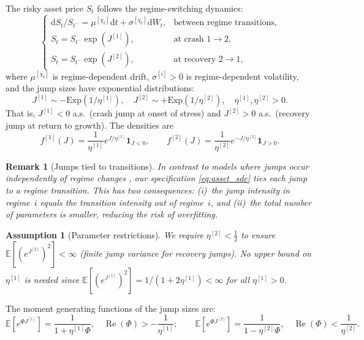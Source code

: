 \documentclass[11pt,a4paper]{article}
\numberwithin{equation}{section}
\newtheorem{remark}[theorem]{Remark}
\newtheorem{assumption}[theorem]{Assumption}
\newcommand{\E}{\mathbb{E}}
\newcommand{\dd}{\mathrm{d}}
\newcommand{\ind}{\mathbf{1}}
\DeclareMathOperator{\re}{Re}
\begin{document}
The risky asset price $S_t$ follows the regime-switching dynamics:
\begin{equation}\label{eq:asset_sde}
\begin{cases}
\dd S_t / S_{t^-} = \mu^{[\chi_t]} \dd t + \sigma^{[\chi_t]} \dd W_t, & \text{between regime transitions,} \\[4pt]
S_t = S_{t^-} \exp(J^{[1]}), & \text{at crash } 1 \to 2, \\[4pt]
S_t = S_{t^-} \exp(J^{[2]}), & \text{at recovery } 2 \to 1,
\end{cases}
\end{equation}
where $\mu^{[\chi_t]}$ is regime-dependent drift, $\sigma^{[i]} > 0$ is regime-dependent volatility, and the jump sizes have exponential distributions:
\begin{equation}\label{eq:jump_dist}
J^{[1]} \sim -\mathrm{Exp}(1/\eta^{[1]}), \quad J^{[2]} \sim +\mathrm{Exp}(1/\eta^{[2]}), \quad \eta^{[1]}, \eta^{[2]} > 0.
\end{equation}
That is, $J^{[1]} < 0$ a.s.\ (crash jump at onset of stress) and $J^{[2]} > 0$ a.s.\ (recovery jump at return to growth). The densities are
\begin{equation}\label{eq:jump_pdf}
f^{[1]}(J) = \frac{1}{\eta^{[1]}} e^{J/\eta^{[1]}} \ind_{J < 0}, \qquad f^{[2]}(J) = \frac{1}{\eta^{[2]}} e^{-J/\eta^{[2]}} \ind_{J > 0}.
\end{equation}

\begin{remark}[Jumps tied to transitions]\label{rem:jump_tied}
In contrast to models where jumps occur independently of regime changes \citep[e.g.,][]{ShiXu2025}, our specification \eqref{eq:asset_sde} ties each jump to a regime transition. This has two consequences: (i)~the jump intensity in regime~$i$ equals the transition intensity out of regime~$i$, and (ii)~the total number of parameters is smaller, reducing the risk of overfitting.
\end{remark}

\begin{assumption}[Parameter restrictions]\label{ass:params}
We require $\eta^{[2]} < \tfrac{1}{2}$ to ensure $\E[(e^{J^{[2]}})^2] < \infty$ (finite jump variance for recovery jumps). No upper bound on $\eta^{[1]}$ is needed since $\E[(e^{J^{[1]}})^2] = 1/(1+2\eta^{[1]}) < \infty$ for all $\eta^{[1]} > 0$.
\end{assumption}

The moment generating functions of the jump sizes are:
\begin{equation}\label{eq:jump_mgf}
\E[e^{\Phi J^{[1]}}] = \frac{1}{1 + \eta^{[1]} \Phi}, \quad \re(\Phi) > -\frac{1}{\eta^{[1]}}; \qquad
\E[e^{\Phi J^{[2]}}] = \frac{1}{1 - \eta^{[2]} \Phi}, \quad \re(\Phi) < \frac{1}{\eta^{[2]}}.
\end{equation}
\end{document}

